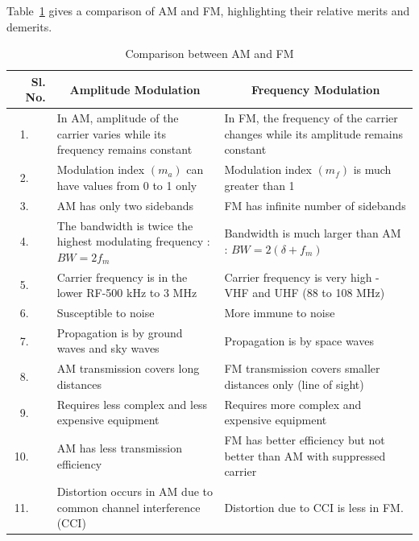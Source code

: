 Table~\ref{tab9.2} gives a comparison of AM and FM, highlighting their relative merits and demerits.
{\renewcommand{\arraystretch}{1.2}
\begin{longtable}[c]{|r|p{5.7cm}|p{5.7cm}|}
\caption{Comparison between AM and FM}\label{tab9.2}\\
\hline
Sl. No. & \multicolumn{1}{c|}{\bf Amplitude Modulation} & \multicolumn{1}{c|}{\bf Frequency Modulation}\\[3pt] 
\hline
1.~~~ & In AM, amplitude of the carrier varies while its frequency remains constant & In FM, the frequency of the carrier changes while its amplitude remains constant\\
\hline
2.~~~ & Modulation index $(m_{a})$ can have values from 0 to 1 only & Modulation index $(m_{f})$ is much greater than 1\\
\hline
3.~~~ & AM has only two sidebands & FM has infinite number of sidebands\\
\hline
4.~~~ & The bandwidth is twice the highest modulating frequency : $BW=2f_{m}$ & Bandwidth is much larger than AM : $BW=2(\delta+f_{m})$\\
\hline
5.~~~ & Carrier frequency is in the lower RF-500 kHz to 3 MHz &  Carrier frequency is very high - VHF and UHF (88 to 108 MHz)\\
\hline
6.~~~ & Susceptible to noise & More immune to noise\\
\hline
7.~~~ & Propagation is by ground waves and sky waves & Propagation is by space waves\\
\hline
8.~~~ & AM transmission covers long distances & FM transmission covers smaller distances only (line of sight)\\
\hline
9.~~~ & Requires less complex and less expensive equipment & Requires more complex and expensive equipment\\
\hline
10.~~~ & AM has less transmission efficiency & FM has better efficiency but not better than AM with suppressed carrier\\
\hline
11.~~~ & Distortion occurs in AM due to common channel interference (CCI) & Distortion due to CCI is less in FM.\\
\hline
\end{longtable}}\relax

\newpage

